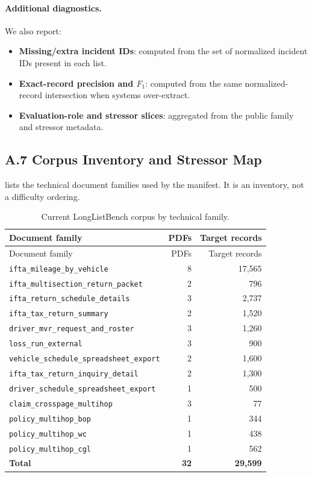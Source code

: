 \paragraph{Additional diagnostics.}
We also report:
\begin{itemize}
    \item \textbf{Missing/extra incident IDs}: computed from the set of normalized incident IDs present in each list.
    \item \textbf{Exact-record precision and $F_1$}: computed from the same normalized-record intersection when systems over-extract.
    \item \textbf{Evaluation-role and stressor slices}: aggregated from the public family and stressor metadata.
\end{itemize}

\subsection*{A.7 Corpus Inventory and Stressor Map}

 lists the technical document families used by the manifest. It is an inventory, not a difficulty ordering.

\begingroup
\small
\begin{longtable}{@{}lrr@{}}
\caption{Current LongListBench corpus by technical family.}
\label{tab:dataset-scale}\\
\toprule
Document family & PDFs & Target records \\
\midrule
\endfirsthead
\toprule
Document family & PDFs & Target records \\
\midrule
\endhead
\bottomrule
\endlastfoot
\texttt{ifta\_mileage\_by\_vehicle} & 8 & 17{,}565 \\
\texttt{ifta\_multisection\_return\_packet} & 2 & 796 \\
\texttt{ifta\_return\_schedule\_details} & 3 & 2{,}737 \\
\texttt{ifta\_tax\_return\_summary} & 2 & 1{,}520 \\
\texttt{driver\_mvr\_request\_and\_roster} & 3 & 1{,}260 \\
\texttt{loss\_run\_external} & 3 & 900 \\
\texttt{vehicle\_schedule\_spreadsheet\_export} & 2 & 1{,}600 \\
\texttt{ifta\_tax\_return\_inquiry\_detail} & 2 & 1{,}300 \\
\texttt{driver\_schedule\_spreadsheet\_export} & 1 & 500 \\
\texttt{claim\_crosspage\_multihop} & 3 & 77 \\
\texttt{policy\_multihop\_bop} & 1 & 344 \\
\texttt{policy\_multihop\_wc} & 1 & 438 \\
\texttt{policy\_multihop\_cgl} & 1 & 562 \\
\midrule
\textbf{Total} & \textbf{32} & \textbf{29{,}599} \\
\end{longtable}
\endgroup

